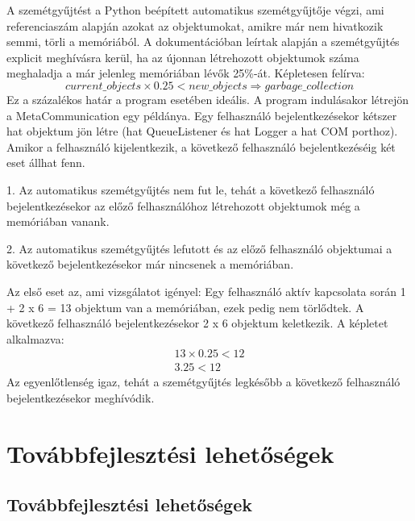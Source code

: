 \documentclass[12pt]{report}
\begin{document}
A szemétgyűjtést a Python beépített automatikus szemétgyűjtője végzi, ami referenciaszám alapján azokat az objektumokat, amikre már nem hivatkozik semmi, törli a memóriából.
A dokumentációban leírtak alapján a szemétgyűjtés explicit meghívásra kerül, ha az újonnan létrehozott objektumok száma meghaladja a már jelenleg memóriában lévők 25\%-át.
Képletesen felírva:
\begin{equation}
    current\_objects \times 0.25 < new\_objects \Rightarrow garbage\_collection
\end{equation}
Ez a százalékos határ a program esetében ideális. A program indulásakor létrejön a MetaCommunication egy példánya.
Egy felhasználó bejelentkezésekor kétszer hat objektum jön létre (hat QueueListener és hat Logger a hat COM porthoz).
Amikor a felhasználó kijelentkezik, a következő felhasználó bejelentkezéséig két eset állhat fenn.

1. Az automatikus szemétgyűjtés nem fut le, tehát a következő felhasználó bejelentkezésekor az előző felhasználóhoz létrehozott objektumok még a memóriában vanank.

2. Az automatikus szemétgyűjtés lefutott és az előző felhasználó objektumai a következő bejelentkezésekor már nincsenek a memóriában.

Az első eset az, ami vizsgálatot igényel:
Egy felhasználó aktív kapcsolata során 1 + 2 x 6 = 13 objektum van a memóriában, ezek pedig nem törlődtek.
A következő felhasználó bejelentkezésekor 2 x 6 objektum keletkezik. A képletet alkalmazva:
\begin{align*}
    13 \times 0.25 < 12 \\
    3.25 < 12
\end{align*}
Az egyenlőtlenség igaz, tehát a szemétgyűjtés legkésőbb a következő felhasználó bejelentkezésekor meghívódik.


\chapter{Továbbfejlesztési lehetőségek}
\section{Továbbfejlesztési lehetőségek}
\end{document}

